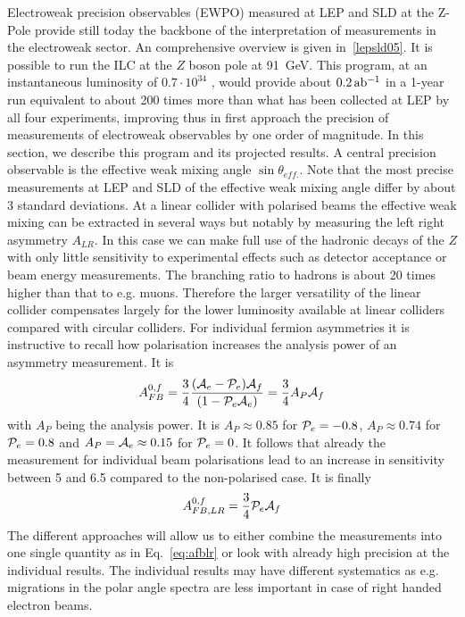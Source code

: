 

Electroweak precision observables (EWPO) measured at LEP and SLD at the Z-Pole provide still today the backbone of the interpretation of measurements in the electroweak sector. An comprehensive overview is given in~\ref{lepsld05}.    
It is possible to run the ILC at the $Z$ boson pole at 91~GeV.   This
program, at an instantaneous luminosity of  $0.7\cdot10^{34}$ , would provide  about $0.2\,{\rm ab^{-1}}$ in a 1-year run equivalent to about 200 times more than what has been collected at LEP by all four experiments, improving thus in first approach the precision of measurements of electroweak observables by one order of magnitude.  In this section, we describe this program and its projected results. 
A central precision observable is the effective weak mixing angle $\sin\theta_{eff.}$. Note that the most precise measurements at LEP and SLD of the effective weak mixing angle differ by about 3 standard deviations. At a linear collider with polarised beams the effective weak mixing can be extracted in several ways but notably by measuring the left right asymmetry $A_{LR}$. In this case we can make full use of the hadronic decays of the $Z$ with only little sensitivity to experimental effects such as detector acceptance or beam energy measurements. The branching ratio to hadrons is about 20 times higher than that to e.g. muons. Therefore the larger versatility of the linear collider compensates largely for the lower luminosity available at linear colliders compared with circular colliders. 
For individual fermion asymmetries it is instructive to recall how polarisation increases the analysis power of an asymmetry measurement. It is \begin{equation}
A^{0,f}_{FB} = \frac{3}{4}\frac{({\cal A}_e - {\cal P}_e){\cal A}_f}{(1-{\cal P}_e{\cal A}_e)} =  \frac{3}{4} A_P {\cal A}_f  
\end{equation} 
with $A_P$ being the analysis power. It is $A_P\approx 0.85$ for ${\cal P}_e = -0.8$, $A_P\approx 0.74$ for ${\cal P}_e = 0.8$ and $A_P = {\cal A}_e \approx 0.15$ for ${\cal P}_e = 0$.
It follows that already the measurement for individual beam polarisations lead to an increase in sensitivity between 5 and 6.5 compared to the non-polarised case.    
It is finally 
\begin{equation}
A^{0,f}_{FB,LR} = \frac{3}{4} {\cal P}_e {\cal A}_f
\label{eq:afblr}
\end{equation}
The different approaches will allow us to either combine the measurements into one single quantity as in Eq.~\ref{eq:afblr} or look with already high precision at the individual results. The individual results may have different systematics as e.g. migrations in the polar angle spectra are less important in case of right handed electron beams.  
